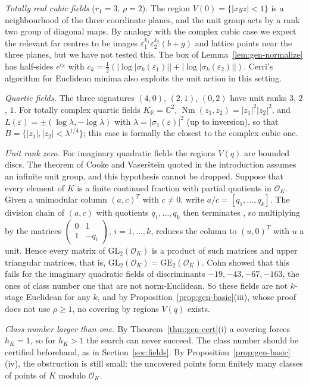 \documentclass[11pt]{amsart}
\theoremstyle{definition}
\theoremstyle{remark}
\numberwithin{equation}{section}
\newcommand{\R}{\mathbb{R}}
\newcommand{\C}{\mathbb{C}}
\newcommand{\cO}{\mathcal{O}}
\newcommand{\Nm}{\operatorname{Nm}}
\begin{document}
\emph{Totally real cubic fields} ($r_1=3$, $\rho=2$). The region $V(0)=\{|xyz|<1\}$ is a
neighbourhood of the three coordinate planes, and the unit group acts by a rank two group of
diagonal maps. By analogy with the complex cubic case we expect the relevant far centres to be
images $\varepsilon_1^{k_1}\varepsilon_2^{k_2}(b+g)$ and lattice points near the three planes,
but we have not tested this. The box of Lemma~\ref{lem:gen-normalize}
has half-sides $e^{c_k}$ with $c_k=\frac12(|\log|\sigma_k(\varepsilon_1)||+|\log|\sigma_k(\varepsilon_2)||)$.
Cerri's algorithm for Euclidean minima \cite{Ce} also exploits the unit action in this setting.

\emph{Quartic fields.} The three signatures $(4,0)$, $(2,1)$, $(0,2)$ have unit ranks $3$, $2$,
$1$. For totally complex quartic fields $K_\R=\C^2$, $\Nm(z_1,z_2)=|z_1|^2|z_2|^2$, and
$L(\varepsilon)=\pm(\log\lambda,-\log\lambda)$ with $\lambda=|\sigma_1(\varepsilon)|^{2}$ (up to
inversion), so that $B=\{|z_1|,|z_2|<\lambda^{1/4}\}$; this case is formally the closest to the
complex cubic one.

\emph{Unit rank zero.} For imaginary quadratic fields the regions $V(q)$ are bounded discs.
The theorem of Cooke and Vaser\v{s}te\u{\i}n quoted in the introduction assumes an infinite unit
group, and this hypothesis cannot be dropped. Suppose that every element of $K$ is a finite
continued fraction with partial quotients in $\cO_K$. Given a unimodular column
$(a,c)^{T}$ with $c\neq0$, write $a/c=[q_1,\dots,q_k]$. The division chain of $(a,c)$ with
quotients $q_1,\dots,q_k$ then terminates \cite[(0.8)]{Le2}, so multiplying by the matrices
$\left(\begin{smallmatrix}0&1\\1&-q_i\end{smallmatrix}\right)$, $i=1,\dots,k$, reduces the column
to $(u,0)^{T}$ with $u$ a unit. Hence every matrix of $\mathrm{GL}_2(\cO_K)$ is a product of
such matrices and upper triangular matrices, that is,
$\mathrm{GL}_2(\cO_K)=\mathrm{GE}_2(\cO_K)$. Cohn \cite{Cohn} showed that this fails for the
imaginary quadratic fields of discriminants $-19,-43,-67,-163$, the ones of class number one
that are not norm-Euclidean. So these fields are not $k$-stage Euclidean for any $k$, and by
Proposition~\ref{prop:gen-basic}(iii), whose proof does not use $\rho\ge1$, no covering by
regions $V(q)$ exists.

\emph{Class number larger than one.} By Theorem~\ref{thm:gen-cert}(i) a covering forces
$h_K=1$, so for $h_K>1$ the search can never succeed. The class number should be certified
beforehand, as in Section~\ref{sec:fields}. By Proposition~\ref{prop:gen-basic}(iv), the
obstruction is still small: the uncovered points form finitely many classes of points of $K$
modulo $\cO_K$.
\end{document}
